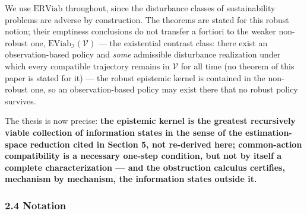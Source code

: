 \documentclass[11pt]{article}
\begin{document}
We use \(\mathrm{ERViab}\) throughout, since the disturbance classes of
sustainability problems are adverse by construction. The theorems are
stated for this robust notion; their emptiness conclusions do not
transfer a fortiori to the weaker non-robust one,
\(\mathrm{EViab}_{\mathcal{I}}(\mathcal{V})\) --- the existential contrast class: there exist an observation-based policy and
\emph{some} admissible disturbance realization under which every
compatible trajectory remains in \(\mathcal{V}\) for all time (no
theorem of this paper is stated for it) --- the robust epistemic kernel
is contained in the non-robust one, so an observation-based policy may
exist there that no robust policy survives.

The thesis is now precise:
\textbf{the epistemic kernel is the greatest recursively viable
collection of information states in the sense of the estimation-space
reduction cited in Section 5, not re-derived here; common-action
compatibility is a necessary one-step condition, but not by itself a
complete characterization --- and the obstruction calculus certifies,
mechanism by mechanism, the information states outside it.}

\subsubsection{2.4 Notation}\label{notation}
\end{document}
